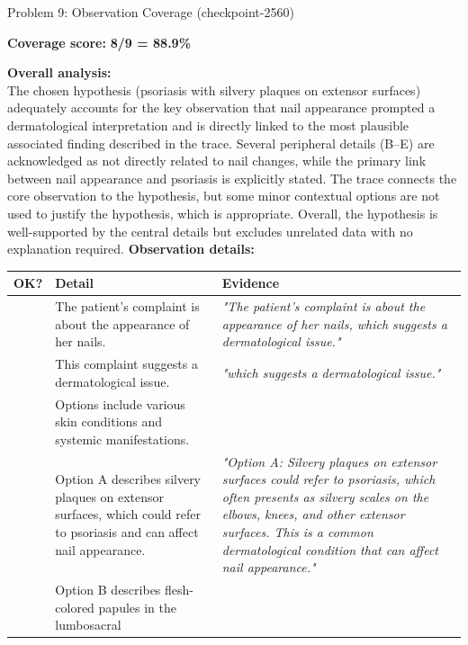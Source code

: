 \documentclass{beamer}
\newcommand{\cmark}{\textcolor{green!60!black}{\ding{51}}}
\newcommand{\xmark}{\textcolor{red}{\ding{55}}}
\begin{document}
\begin{frame}[allowframebreaks]{Problem 9: Observation Coverage (checkpoint-2560)}
    \begin{center}
    \textbf{Coverage score: } {\Large\textbf{8/9 = 88.9\%}}
    \end{center}
    \vspace{4pt}
    \textbf{Overall analysis:}\\[4pt]
    \small The chosen hypothesis (psoriasis with silvery plaques on extensor surfaces)
adequately accounts for the key observation that nail appearance prompted a
dermatological interpretation and is directly linked to the most plausible associated
finding described in the trace. Several peripheral details (B–E) are acknowledged as
not directly related to nail changes, while the primary link between nail appearance
and psoriasis is explicitly stated. The trace connects the core observation to the
hypothesis, but some minor contextual options are not used to justify the hypothesis,
which is appropriate. Overall, the hypothesis is well-supported by the central
details but excludes unrelated data with no explanation required.
    \vspace{8pt}
    \textbf{Observation details:}\\[4pt]
    \begin{tabularx}{\textwidth}{>{\centering\arraybackslash}p{0.9cm} X p{4.5cm}}
    \toprule
    \textbf{OK?} & \textbf{Detail} & \textbf{Evidence} \\
    \midrule
      \cmark & \small The patient's complaint is about the appearance of her
nails. & \small\itshape "The patient's complaint is about the
appearance of her nails, which suggests
a dermatological issue." \\
      \cmark & \small This complaint suggests a dermatological issue. & \small\itshape "which suggests a dermatological issue." \\
      \xmark & \small Options include various skin conditions and systemic
manifestations. & \small\itshape  \\
      \cmark & \small Option A describes silvery plaques on extensor surfaces,
which could refer to psoriasis and can affect nail
appearance. & \small\itshape "Option A: Silvery plaques on extensor
surfaces could refer to psoriasis, which
often presents as silvery scales on the
elbows, knees, and other extensor
surfaces. This is a common
dermatological condition that can affect
nail appearance." \\
      \cmark & \small Option B describes flesh-colored papules in the lumbosacral

\end{tabularx}
\end{frame}
\end{document}
